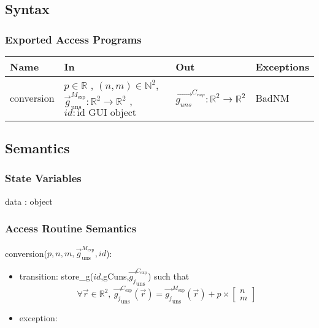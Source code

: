 \documentclass[12pt, titlepage]{article}
\begin{document}
\subsection{Syntax}

\subsubsection{Exported Access Programs}

\begin{center}
\begin{tabular}{p{2cm} p{4cm} p{4cm} p{2cm}}
\hline
\textbf{Name} & \textbf{In} & \textbf{Out} & \textbf{Exceptions} \\
\hline
conversion & $p \in \mathbb{R}$ , $(n,m) \in \mathbb{N}^2$, $\overrightarrow{g}_{\text{uns}}^{M_{\text{exp}}}:\mathbb{R}^2\rightarrow\mathbb{R}^2$ , $id : \text{id GUI object}$  & $\overrightarrow{g_{uns}}^{C_{exp}}:\mathbb{R}^2\rightarrow\mathbb{R}^2$ & BadNM \\
\hline
\end{tabular}
\end{center}

\subsection{Semantics}

\subsubsection{State Variables}
data : object

\subsubsection{Access Routine Semantics}

\noindent conversion($p,n,m,\overrightarrow{g}_{\text{uns}}^{M_{\text{exp}}},id$):
\begin{itemize}
\item transition: store{\_}g($id$,gCuns,$\overrightarrow{g_{j}}_{\text{uns}}^{C_{\text{exp}}}$) such that
	\begin{equation*}
	\forall \vec{r} \in \mathbb{R}^2, \
	\overrightarrow{g_{j}}_{\text{uns}}^{C_{\text{exp}}}(\vec{r})= \overrightarrow{g_{j}}_{\text{uns}}^{M_{\text{exp}}}(\vec{r}) + p \times \begin{bmatrix}
	n \\
	m
	\end{bmatrix}
	\end{equation*}
\item exception:  
\end{itemize}
\end{document}
